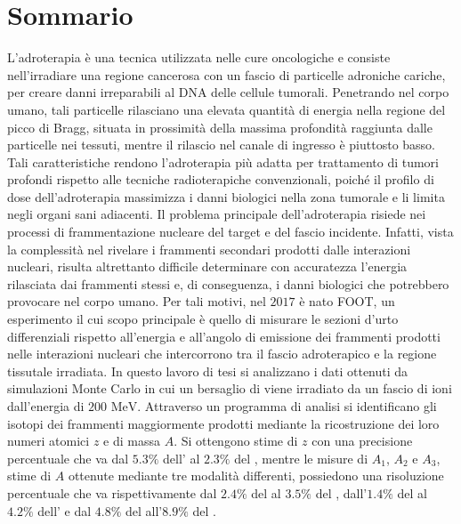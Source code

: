 \documentclass[12pt,a4paper,twoside]{report}
\begin{document}
	\chapter*{Sommario}
	L'adroterapia è una tecnica utilizzata nelle cure oncologiche e consiste nell'irradiare una regione cancerosa con un fascio di particelle adroniche cariche, per creare danni irreparabili al DNA delle cellule tumorali. Penetrando nel corpo umano, tali particelle rilasciano una elevata quantità di energia nella regione del picco di Bragg, situata in prossimità della massima profondità raggiunta dalle particelle nei tessuti, mentre il rilascio nel canale di ingresso è piuttosto basso. Tali caratteristiche rendono l'adroterapia più adatta per trattamento di tumori profondi rispetto alle tecniche radioterapiche convenzionali, poiché il profilo di dose dell'adroterapia massimizza i danni biologici nella zona tumorale e li limita negli organi sani adiacenti. Il problema principale dell'adroterapia risiede nei processi di frammentazione nucleare del target e del fascio incidente. Infatti, vista la complessità nel rivelare i frammenti secondari prodotti dalle interazioni nucleari, risulta altrettanto difficile determinare con accuratezza l'energia rilasciata dai frammenti stessi e, di conseguenza, i danni biologici che potrebbero provocare nel corpo umano. Per tali motivi, nel $2017$ è nato FOOT, un esperimento il cui scopo principale è quello di misurare le sezioni d'urto differenziali rispetto all'energia e all'angolo di emissione dei frammenti prodotti nelle interazioni nucleari che intercorrono tra il fascio adroterapico e la regione tissutale irradiata. In questo lavoro di tesi si analizzano i dati ottenuti da simulazioni Monte Carlo in cui un bersaglio di  viene irradiato da un fascio di ioni  dall'energia di $200 \mbox{ MeV}$. Attraverso un programma di analisi si identificano gli isotopi dei frammenti maggiormente prodotti mediante la ricostruzione dei loro numeri atomici $z$ e di massa $A$. Si ottengono stime di $z$ con una precisione percentuale che va dal $5.3\%$ dell' al $2.3\%$ del , mentre le misure di $A_1$, $A_2$ e $A_3$, stime di $A$ ottenute mediante tre modalità differenti, possiedono una risoluzione percentuale che va rispettivamente dal $2.4\%$ del  al $3.5\%$ del , dall'$1.4\%$ del  al $4.2\%$ dell' e dal $4.8\%$ del  all'$8.9\%$ del .
	\newpage
	\tableofcontents
	\newpage
\end{document}
